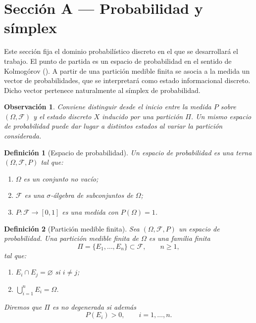 ﻿\documentclass[12pt]{article}
\newtheorem{definicion}{Definición}[section]
\newtheorem{observacion}{Observación}[section]
\begin{document}
\section{Sección A — Probabilidad y símplex}

Este sección  fija el dominio probabilístico discreto en el que se desarrollará el trabajo. El punto de partida es un espacio de probabilidad en el sentido de Kolmogórov (\cite{Kolmogorov1933}). A partir de una partición medible finita se asocia a la medida un vector de probabilidades, que se interpretará como estado informacional discreto. Dicho vector pertenece naturalmente al símplex de probabilidad.

\begin{observacion}
Conviene distinguir desde el inicio entre la medida $P$ sobre $(\Omega,\mathcal F)$ y el estado discreto $X$ inducido por una partición $\Pi$. Un mismo espacio de probabilidad puede dar lugar a distintos estados al variar la partición considerada.
\end{observacion}

\begin{definicion}[Espacio de probabilidad]\label{def:espacio_prob}
Un \emph{espacio de probabilidad} es una terna $(\Omega,\mathcal F,P)$ tal que:
\begin{enumerate}
    \item $\Omega$ es un conjunto no vacío;
    \item $\mathcal F$ es una $\sigma$-álgebra de subconjuntos de $\Omega$;
    \item $P:\mathcal F\to[0,1]$ es una medida con $P(\Omega)=1$.
\end{enumerate}
\end{definicion}

\begin{definicion}[Partición medible finita]\label{def:particion}
Sea $(\Omega,\mathcal F,P)$ un espacio de probabilidad. Una \emph{partición medible finita} de $\Omega$ es una familia finita
\[
\Pi=\{E_1,\dots,E_n\}\subset \mathcal F,\qquad n\ge 1,
\]
tal que:
\begin{enumerate}
    \item $E_i\cap E_j=\varnothing$ si $i\neq j$;
    \item $\bigcup_{i=1}^n E_i=\Omega$.
\end{enumerate}

Diremos que $\Pi$ es \emph{no degenerada} si además
\[
P(E_i)>0,\qquad i=1,\dots,n.
\]
\end{definicion}
\end{document}
